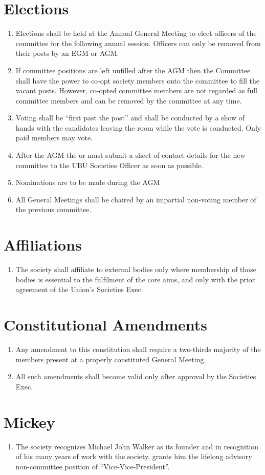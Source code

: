 \documentclass[a4paper,10pt]{article}
\begin{document}
\section{Elections}
\begin{enumerate}
  \item Elections shall be held at the Annual General Meeting to elect officers of the committee for the following annual session. Officers can only be removed from their posts by an EGM or AGM.
  \item If committee positions are left unfilled after the AGM then the Committee shall have the power to co-opt society members onto the committee to fill the vacant posts. However, co-opted committee members are not regarded as full committee members and can be removed by the committee at any time.
  \item Voting shall be “first past the post” and shall be conducted by a show of hands with the candidates leaving the room while the vote is conducted. Only paid members may vote.
  \item After the AGM the   or   must submit a sheet of contact details for the new committee to the UBU Societies Officer as soon as possible.
  \item Nominations are to be made during the AGM
  \item All General Meetings shall be chaired by an impartial non-voting member of the previous committee.
\end{enumerate}

\section{Affiliations}
\begin{enumerate}
  \item The society shall affiliate to external bodies only where membership of those bodies is essential to the fulfilment of the core aims, and only with the prior agreement of the Union’s Societies Exec.
\end{enumerate}

\section{Constitutional Amendments}
\begin{enumerate}
  \item Any amendment to this constitution shall require a two-thirds majority of the members present at a properly constituted General Meeting.
  \item All such amendments shall become valid only after approval by the Societies Exec.
\end{enumerate}

\section{Mickey}
\begin{enumerate}
  \item The society recognizes Michael John Walker as its founder and in recognition of his many years of work with the society, grants him the lifelong advisory non-committee position of “Vice-Vice-President”.
\end{enumerate}
\end{document}
